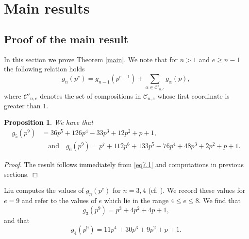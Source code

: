 \documentclass[a4paper]{amsart}
\newtheorem{proposition}[theorem]{Proposition}
\numberwithin{equation}{section}
\theoremstyle{remark}
\begin{document}
\section{Main results}
\subsection{Proof of the main result}\label{s 7.1}In this section we prove Theorem \ref{main}. We note that for $n > 1$ and $e \geq n-1$ the following relation holds
\begin{equation}\label{eq7.1}
    g_n(p^e) = g_{n-1}(p^{e-1}) + \sum_{\alpha \in \mathcal{C}'_{n,e}}g_{\alpha}(p),
\end{equation}
where $\mathcal{C}'_{n,e}$ denotes the set of compositions in $\mathcal{C}_{n,e}$ whose first coordinate is greater than $1$.
\begin{proposition}
    We have that
    \[\begin{aligned}
    g_5(p^9)&=36p^5+126p^4-33p^3+12p^2+p+1,\\
    &\quad\text{and}\quad
    g_6(p^9)=p^7+112p^6+133p^5-76p^4+48p^3+2p^2+p+1.
    \end{aligned}\]
\end{proposition}
\begin{proof}
The result follows immediately from \eqref{eq7.1} and computations in previous sections.
\end{proof}
Liu computes the values of $g_n(p^e)$ for $n=3,4$ (cf. \cite[Proposition 6.1 and 6.2]{liu2007counting}). We record these values for $e=9$ and refer to \cite[p. 231]{atanasov2021counting} the values of $e$ which lie in the range $4\leq e\leq 8$. We find that
\begin{equation*}
    g_3(p^9) = p^3 + 4p^2 + 4p + 1,
\end{equation*}
and that
\begin{equation*}
    g_4(p^9) = 11p^4+30p^3+9p^2+p+1.
\end{equation*}
\end{document}
